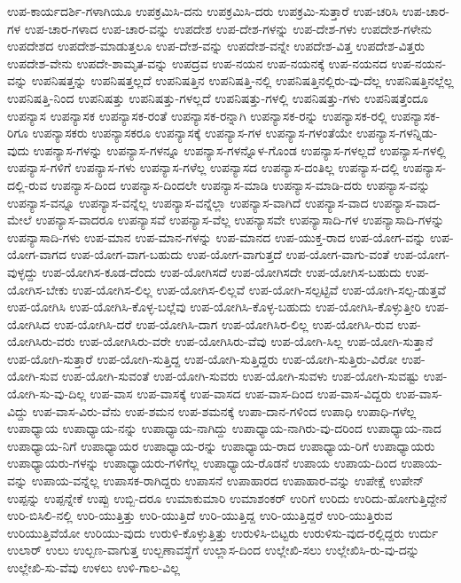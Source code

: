 {ಉಪ-ಕಾರ್ಯದರ್ಶಿ-ಗಳಾಗಿಯೂ
ಉಪಕ್ರಮಿಸಿ-ದನು
ಉಪಕ್ರಮಿಸಿ-ದರು
ಉಪಕ್ರಮಿ-ಸುತ್ತಾರೆ
ಉಪ-ಚರಿಸಿ
ಉಪ-ಚಾರ-ಗಳ
ಉಪ-ಚಾರ-ಗಳಾದ
ಉಪ-ಚಾರ-ವನ್ನು
ಉಪದೇಶ
ಉಪ-ದೇಶ-ಗಳನ್ನು
ಉಪ-ದೇಶ-ಗಳು
ಉಪದೇಶ-ಗಳೇನು
ಉಪದೇಶದ
ಉಪದೇಶ-ಮಾಡುತ್ತಲೂ
ಉಪ-ದೇಶ-ವನ್ನು
ಉಪದೇಶ-ವನ್ನೇ
ಉಪದೇಶ-ವಿತ್ತ
ಉಪದೇಶ-ವಿತ್ತರು
ಉಪದೇಶ-ವೇನು
ಉಪದೇ-ಶಾಮೃತ-ವನ್ನು
ಉಪದ್ರವ
ಉಪ-ನಯನ
ಉಪ-ನಯನಕ್ಕೆ
ಉಪ-ನಯನದ
ಉಪ-ನಯನ-ವನ್ನು
ಉಪನಿಷತ್ತನ್ನು
ಉಪನಿಷತ್ತಲ್ಲದೆ
ಉಪನಿಷತ್ತಿನ
ಉಪನಿಷತ್ತಿ-ನಲ್ಲಿ
ಉಪನಿಷತ್ತಿನಲ್ಲಿರು-ವು-ದೆಲ್ಲ
ಉಪನಿಷತ್ತಿನಲ್ಲೆಲ್ಲ
ಉಪನಿಷತ್ತಿ-ನಿಂದ
ಉಪನಿಷತ್ತು
ಉಪನಿಷತ್ತು-ಗಳಲ್ಲದೆ
ಉಪನಿಷತ್ತು-ಗಳಲ್ಲಿ
ಉಪನಿಷತ್ತು-ಗಳು
ಉಪನಿಷತ್ತೆಂದೂ
ಉಪನ್ಯಾಸ
ಉಪನ್ಯಾಸಕ
ಉಪನ್ಯಾಸಕ-ರಂತೆ
ಉಪನ್ಯಾಸಕ-ರನ್ನಾಗಿ
ಉಪನ್ಯಾಸಕ-ರನ್ನು
ಉಪನ್ಯಾಸಕ-ರಲ್ಲಿ
ಉಪನ್ಯಾಸಕ-ರಿಗೂ
ಉಪನ್ಯಾಸಕರು
ಉಪನ್ಯಾಸಕರೂ
ಉಪನ್ಯಾಸಕ್ಕೆ
ಉಪನ್ಯಾಸ-ಗಳ
ಉಪನ್ಯಾಸ-ಗಳಂತೆಯೇ
ಉಪನ್ಯಾಸ-ಗಳನ್ನಿಡು-ವುದು
ಉಪನ್ಯಾಸ-ಗಳನ್ನು
ಉಪನ್ಯಾಸ-ಗಳನ್ನೂ
ಉಪನ್ಯಾಸ-ಗಳನ್ನೊಳ-ಗೊಂಡ
ಉಪನ್ಯಾಸ-ಗಳಲ್ಲದೆ
ಉಪನ್ಯಾಸ-ಗಳಲ್ಲಿ
ಉಪನ್ಯಾಸ-ಗಳಿಗೆ
ಉಪನ್ಯಾಸ-ಗಳು
ಉಪನ್ಯಾಸ-ಗಳೆಲ್ಲ
ಉಪನ್ಯಾಸದ
ಉಪನ್ಯಾಸ-ದಂತಿಲ್ಲ
ಉಪನ್ಯಾಸ-ದಲ್ಲಿ
ಉಪನ್ಯಾಸ-ದಲ್ಲಿ-ರುವ
ಉಪನ್ಯಾಸ-ದಿಂದ
ಉಪನ್ಯಾಸ-ದಿಂದಲೇ
ಉಪನ್ಯಾಸ-ಮಾಡಿ
ಉಪನ್ಯಾಸ-ಮಾಡಿ-ದರು
ಉಪನ್ಯಾಸ-ವನ್ನು
ಉಪನ್ಯಾಸ-ವನ್ನೂ
ಉಪನ್ಯಾಸ-ವನ್ನೆಲ್ಲ
ಉಪನ್ಯಾಸ-ವನ್ನೆಲ್ಲಾ
ಉಪನ್ಯಾಸ-ವಾಗಿದೆ
ಉಪನ್ಯಾಸ-ವಾದ
ಉಪನ್ಯಾಸ-ವಾದ-ಮೇಲೆ
ಉಪನ್ಯಾಸ-ವಾದರೂ
ಉಪನ್ಯಾಸವೆ
ಉಪನ್ಯಾಸ-ವೆಲ್ಲ
ಉಪನ್ಯಾಸವೇ
ಉಪನ್ಯಾಸಾದಿ-ಗಳ
ಉಪನ್ಯಾಸಾದಿ-ಗಳನ್ನು
ಉಪನ್ಯಾಸಾದಿ-ಗಳು
ಉಪ-ಮಾನ
ಉಪ-ಮಾನ-ಗಳನ್ನು
ಉಪ-ಮಾನದ
ಉಪ-ಯುಕ್ತ-ರಾದ
ಉಪ-ಯೋಗ-ವನ್ನು
ಉಪ-ಯೋಗ-ವಾಗದ
ಉಪ-ಯೋಗ-ವಾಗ-ಬಹುದು
ಉಪ-ಯೋಗ-ವಾಗುತ್ತದೆ
ಉಪ-ಯೋಗ-ವಾಗು-ವಂತೆ
ಉಪ-ಯೋಗ-ವುಳ್ಳದ್ದು
ಉಪ-ಯೋಗಿಸ-ಕೂಡ-ದೆಂದು
ಉಪ-ಯೋಗಿಸದೆ
ಉಪ-ಯೋಗಿಸದೇ
ಉಪ-ಯೋಗಿಸ-ಬಹುದು
ಉಪ-ಯೋಗಿಸ-ಬೇಕು
ಉಪ-ಯೋಗಿಸ-ಲಿಲ್ಲ
ಉಪ-ಯೋಗಿಸ-ಲಿಲ್ಲವೆ
ಉಪ-ಯೋಗಿ-ಸಲ್ಪಟ್ಟಿವೆ
ಉಪ-ಯೋಗಿ-ಸಲ್ಪ-ಡುತ್ತವೆ
ಉಪ-ಯೋಗಿಸಿ
ಉಪ-ಯೋಗಿಸಿ-ಕೊಳ್ಳ-ಬಲ್ಲೆವು
ಉಪ-ಯೋಗಿಸಿ-ಕೊಳ್ಳ-ಬಹುದು
ಉಪ-ಯೋಗಿಸಿ-ಕೊಳ್ಳುತ್ತೀರಿ
ಉಪ-ಯೋಗಿಸಿದ
ಉಪ-ಯೋಗಿಸಿ-ದರೆ
ಉಪ-ಯೋಗಿಸಿ-ದಾಗ
ಉಪ-ಯೋಗಿಸಿರ-ಲಿಲ್ಲ
ಉಪ-ಯೋಗಿಸಿ-ರುವ
ಉಪ-ಯೋಗಿಸಿರು-ವರು
ಉಪ-ಯೋಗಿಸಿರು-ವರೇ
ಉಪ-ಯೋಗಿಸಿರು-ವೆವು
ಉಪ-ಯೋಗಿ-ಸಿಲ್ಲ
ಉಪ-ಯೋಗಿ-ಸುತ್ತಾನೆ
ಉಪ-ಯೋಗಿ-ಸುತ್ತಾರೆ
ಉಪ-ಯೋಗಿ-ಸುತ್ತಿದ್ದ
ಉಪ-ಯೋಗಿ-ಸುತ್ತಿದ್ದರು
ಉಪ-ಯೋಗಿ-ಸುತ್ತಿರು-ವಿರೋ
ಉಪ-ಯೋಗಿ-ಸುವ
ಉಪ-ಯೋಗಿ-ಸುವಂತೆ
ಉಪ-ಯೋಗಿ-ಸುವರು
ಉಪ-ಯೋಗಿ-ಸುವಳು
ಉಪ-ಯೋಗಿ-ಸುವಷ್ಟು
ಉಪ-ಯೋಗಿ-ಸು-ವು-ದಿಲ್ಲ
ಉಪ-ವಾಸ
ಉಪ-ವಾಸಕ್ಕೆ
ಉಪ-ವಾಸದ
ಉಪ-ವಾಸ-ದಿಂದ
ಉಪ-ವಾಸ-ವಿದ್ದರು
ಉಪ-ವಾಸ-ವಿದ್ದು
ಉಪ-ವಾಸ-ವಿರು-ವೆನು
ಉಪ-ಶಮನ
ಉಪ-ಶಮನಕ್ಕೆ
ಉಪಾ-ದಾನ-ಗಳಿಂದ
ಉಪಾಧಿ
ಉಪಾಧಿ-ಗಳೆಲ್ಲ
ಉಪಾಧ್ಯಾಯ
ಉಪಾಧ್ಯಾಯ-ನನ್ನು
ಉಪಾಧ್ಯಾಯ-ನಾಗಿದ್ದು
ಉಪಾಧ್ಯಾಯ-ನಾಗಿರು-ವು-ದರಿಂದ
ಉಪಾಧ್ಯಾಯ-ನಾದ
ಉಪಾಧ್ಯಾಯ-ನಿಗೆ
ಉಪಾಧ್ಯಾಯರ
ಉಪಾಧ್ಯಾಯ-ರನ್ನು
ಉಪಾಧ್ಯಾಯ-ರಾದ
ಉಪಾಧ್ಯಾಯ-ರಿಗೆ
ಉಪಾಧ್ಯಾಯರು
ಉಪಾಧ್ಯಾಯರು-ಗಳನ್ನು
ಉಪಾಧ್ಯಾಯರು-ಗಳಿಗೆಲ್ಲ
ಉಪಾಧ್ಯಾಯ-ರೊಡನೆ
ಉಪಾಯ
ಉಪಾಯ-ದಿಂದ
ಉಪಾಯ-ವನ್ನು
ಉಪಾಯ-ವನ್ನೆಲ್ಲ
ಉಪಾಸಕ-ರಾಗಿದ್ದರು
ಉಪಾಸನೆ
ಉಪಾಹಾರದ
ಉಪಾಹಾರ-ವನ್ನು
ಉಪೇಕ್ಷೆ
ಉಪೇನ್
ಉಪ್ಪನ್ನು
ಉಪ್ಪನ್ನೇಕೆ
ಉಪ್ಪು
ಉಬ್ಬಿ-ದರೂ
ಉಮಾಕುಮಾರಿ
ಉಮಾಶಂಕರ್
ಉರಿಗೆ
ಉರಿದು
ಉರಿದು-ಹೋಗುತ್ತಿದ್ದೇನೆ
ಉರಿ-ಬಿಸಿಲಿ-ನಲ್ಲಿ
ಉರಿ-ಯುತ್ತಿತ್ತು
ಉರಿ-ಯುತ್ತಿದೆ
ಉರಿ-ಯುತ್ತಿದ್ದ
ಉರಿ-ಯುತ್ತಿದ್ದರೆ
ಉರಿ-ಯುತ್ತಿರುವ
ಉರಿಯುತ್ತಿವೆಯೋ
ಉರಿಯು-ವುದು
ಉರುಳಿ-ಕೊಳ್ಳುತ್ತಿತ್ತು
ಉರುಳಿಸಿ-ಬಿಟ್ಟರು
ಉರುಳಿಸು-ವುದ-ರಲ್ಲಿದ್ದರು
ಉರ್ದು
ಉಲಾರ್
ಉಲು
ಉಲ್ಬಣ-ವಾಗುತ್ತ
ಉಲ್ಬಣಾವಸ್ಥೆಗೆ
ಉಲ್ಲಾಸ-ದಿಂದ
ಉಲ್ಲೇಖಿ-ಸಲು
ಉಲ್ಲೇಖಿಸಿ-ರು-ವು-ದನ್ನು
ಉಲ್ಲೇಖಿ-ಸು-ವೆವು
ಉಳಲು
ಉಳಿ-ಗಾಲ-ವಿಲ್ಲ
}
